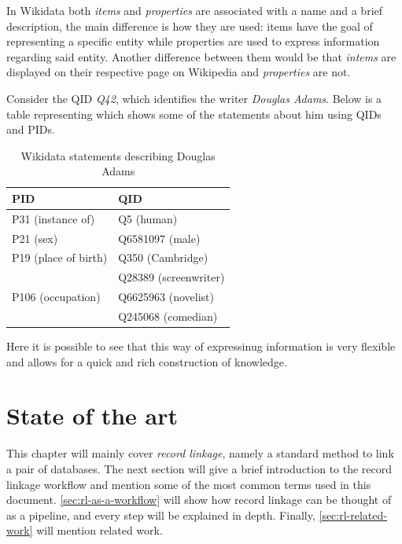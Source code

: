 \documentclass[epsfig,a4paper,11pt,titlepage,twoside,openany]{book}
\begin{document}
In Wikidata both \textit{items} and \textit{properties} are associated with a name and a
brief description, the main difference is how they are used: items have the
goal of representing a specific entity while properties are used to express 
information regarding said entity. Another difference between them would be that \textit{intems} are displayed on their respective page on Wikipedia and \textit{properties} are not.

Consider the QID \textit{Q42}, which identifies the writer
\textit{Douglas Adams}. Below is a table representing which shows some of the statements about him
using QIDs and PIDs.

\begin{table}[H]
  \centering
  \begin{tabular}{l|l}
    PID                                & QID                   \\ \hline
    P31 (instance of)                  & Q5 (human)            \\ \hline
    P21 (sex)                          & Q6581097 (male)       \\ \hline
    P19 (place of birth)               & Q350 (Cambridge)      \\ \hline
    \multirow{3}{*}{P106 (occupation)} & Q28389 (screenwriter) \\ \cline{2-2} 
                                       & Q6625963 (novelist)   \\ \cline{2-2} 
                                       & Q245068 (comedian)   
  \end{tabular}
  \caption{Wikidata statements describing Douglas Adams}
  \label{tab:intro-wikidata-douglas42}
\end{table}

Here it is possible to see that this way of expressinug information is very
flexible and allows for a quick and rich construction of knowledge. 






\chapter{State of the art}
\label{chap:state-of-the-art}

This chapter will mainly cover \textit{record linkage}, namely a standard method to link a pair of databases. The next section will give a brief introduction to the record linkage workflow and mention some of the most common terms used in this document. \autoref{sec:rl-as-a-workflow} will show how record linkage can be thought of as a pipeline, and every step will be explained in depth. Finally, \autoref{sec:rl-related-work} will mention related work.
\end{document}
